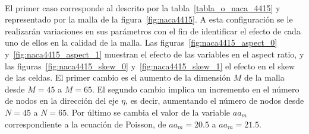 \documentclass[letterpaper, openright, 12pt]{book}
\begin{document}
    \paragraph*{}
    El primer caso corresponde al descrito por la
    tabla~\ref{tabla_o_naca_4415} y representado por la malla de la
    figura~\ref{fig:naca4415}. A esta configuración se le realizarán
    variaciones en sus parámetros con el fin de identificar el efecto de cada
    uno de ellos en la calidad de la malla. Las
    figuras~\ref{fig:naca4415_aspect_0} y~\ref{fig:naca4415_aspect_1}
    muestran el efecto de las variables en el aspect ratio, y las
    figuras~\ref{fig:naca4415_skew_0} y~\ref{fig:naca4415_skew_1} el efecto en
    el skew de las celdas. El primer cambio es el aumento de la dimensión $M$
    de la malla desde $M=45$ a $M=65$. El segundo cambio implica un
    incremento en el número de nodos en la dirección del eje $\eta$, es
    decir, aumentando el número de nodos desde $N=45$ a $N=65$. Por último se
    cambia el valor de la variable $aa_m$ correspondiente a la ecuación de
    Poisson, de $aa_m = 20.5$ a $aa_m=21.5$.
\end{document}
